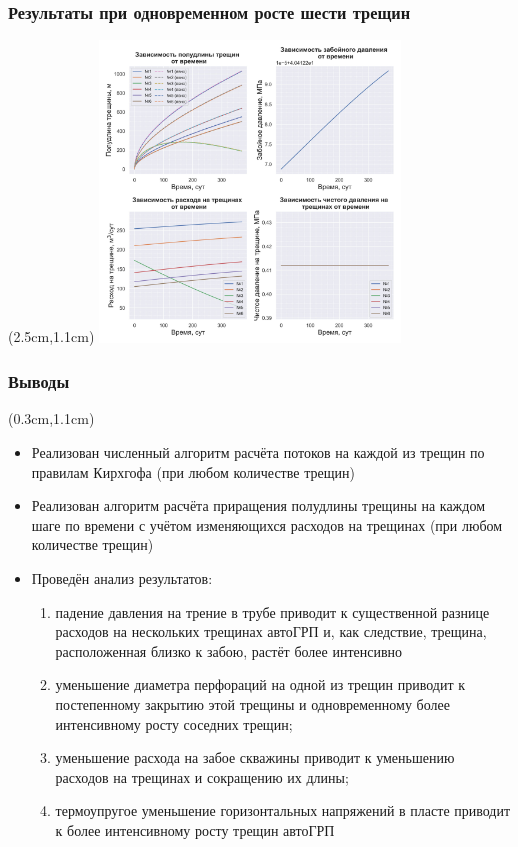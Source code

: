 \documentclass{beamer}
\begin{document}
\begin{frame}
\frametitle{Результаты при одновременном росте шести трещин}

\begin{textblock*}{8cm}(2.5cm,1.1cm)
\includegraphics[width=8cm]{myimage13.jpg}
\end{textblock*}

\end{frame}


\begin{frame}
\frametitle{Выводы}

\small
\begin{textblock*}{12cm}(0.3cm,1.1cm)
\begin{itemize}
	\item Реализован численный алгоритм расчёта потоков на каждой из трещин по правилам Кирхгофа (при любом количестве трещин)
	\item Реализован алгоритм расчёта приращения полудлины трещины на каждом шаге по времени с учётом изменяющихся расходов на трещинах (при любом количестве трещин)
	\item Проведён анализ результатов:
	\begin{enumerate}[\large\textbf{--}]
	\item падение давления на трение в трубе приводит к существенной разнице расходов на нескольких трещинах автоГРП и, как следствие, трещина, расположенная близко к забою, растёт более интенсивно 
	\item уменьшение диаметра перфораций на одной из трещин приводит к постепенному закрытию этой трещины и одновременному более интенсивному росту соседних трещин;
	\item уменьшение расхода на забое скважины приводит к уменьшению расходов на трещинах и сокращению их длины;
	\item термоупругое уменьшение горизонтальных напряжений в пласте приводит к более интенсивному росту трещин автоГРП
	\end{enumerate}
\end{itemize}
\end{textblock*}

\normalsize

\end{frame}
\end{document}
